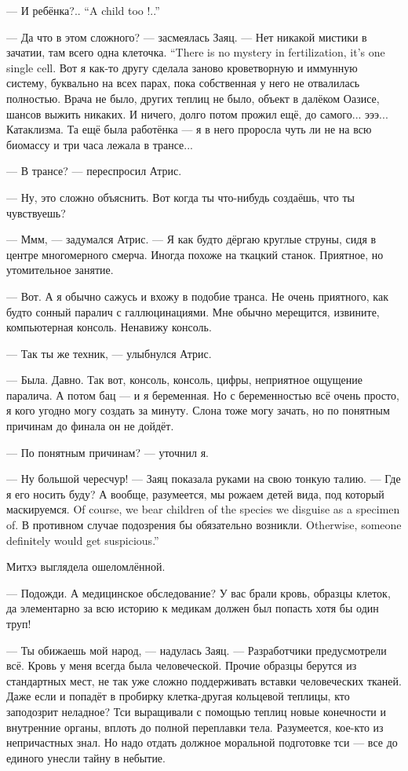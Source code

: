 {--- И ребёнка?..}
{``A child too !..''}

--- Да что в этом сложного? --- засмеялась Заяц.
{--- Нет никакой мистики в зачатии, там всего одна клеточка.}
{``There is no mystery in fertilization, it's one single cell.}
Вот я как-то другу сделала заново кроветворную и иммунную систему, буквально на всех парах, пока собственная у него не отвалилась полностью.
Врача не было, других теплиц не было, объект в далёком Оазисе, шансов выжить никаких.
И ничего, долго потом прожил ещё, до самого... эээ... Катаклизма.
Та ещё была работёнка --- я в него проросла чуть ли не на всю биомассу и три часа лежала в трансе...

--- В трансе? --- переспросил Атрис.

--- Ну, это сложно объяснить.
Вот когда ты что-нибудь создаёшь, что ты чувствуешь?

--- Ммм, --- задумался Атрис.
--- Я как будто дёргаю круглые струны, сидя в центре многомерного смерча.
Иногда похоже на ткацкий станок.
Приятное, но утомительное занятие.

--- Вот.
А я обычно сажусь и вхожу в подобие транса.
Не очень приятного, как будто сонный паралич с галлюцинациями.
Мне обычно мерещится, извините, компьютерная консоль.
Ненавижу консоль.

--- Так ты же техник, --- улыбнулся Атрис.

--- Была.
Давно.
Так вот, консоль, консоль, цифры, неприятное ощущение паралича.
А потом бац --- и я беременная.
Но с беременностью всё очень просто, я кого угодно могу создать за минуту.
Слона тоже могу зачать, но по понятным причинам до финала он не дойдёт.

--- По понятным причинам? --- уточнил я.

--- Ну большой чересчур! --- Заяц показала руками на свою тонкую талию.
--- Где я его носить буду?
{А вообще, разумеется, мы рожаем детей вида, под который маскируемся.}
{Of course, we bear children of the species we disguise as a specimen of.}
{В противном случае подозрения бы обязательно возникли.}
{Otherwise, someone definitely would get suspicious.''}

Митхэ выглядела ошеломлённой.

--- Подожди.
А медицинское обследование?
У вас брали кровь, образцы клеток, да элементарно за всю историю к медикам должен был попасть хотя бы один труп!

--- Ты обижаешь мой народ, --- надулась Заяц.
--- Разработчики предусмотрели всё.
Кровь у меня всегда была человеческой.
Прочие образцы берутся из стандартных мест, не так уже сложно поддерживать вставки человеческих тканей.
Даже если и попадёт в пробирку клетка-другая кольцевой теплицы, кто заподозрит неладное?
Тси выращивали с помощью теплиц новые конечности и внутренние органы, вплоть до полной переплавки тела.
Разумеется, кое-кто из непричастных знал.
Но надо отдать должное моральной подготовке тси --- все до единого унесли тайну в небытие.

